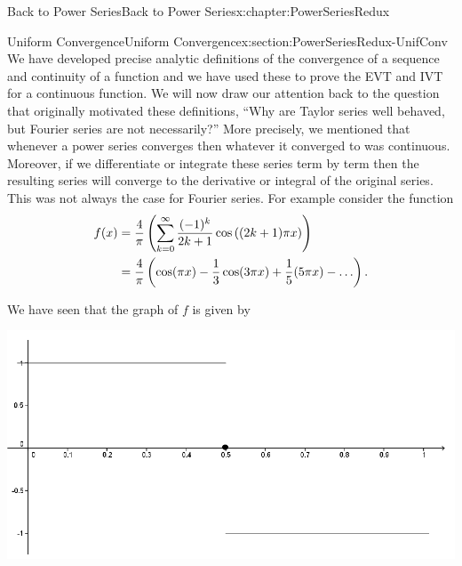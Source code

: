 
\typeout{************************************************}
\typeout{************************************************}
%
\begin{chapterptx}{Back to Power Series}{}{Back to Power Series}{}{}{x:chapter:PowerSeriesRedux}
	\typeout{************************************************}
	\typeout{************************************************}
	\begin{sectionptx}{Uniform Convergence}{}{Uniform Convergence}{}{}{x:section:PowerSeriesRedux-UnifConv}
		We have developed precise analytic definitions of the convergence of a sequence and continuity of a function and we have used these to prove the EVT and IVT for a continuous function. We will now draw our attention back to the question that originally motivated these definitions, ``Why are Taylor series well behaved, but Fourier series are not necessarily?'' More precisely, we mentioned that whenever a power series converges then whatever it converged to was continuous. Moreover, if we differentiate or integrate these series term by term then the resulting series will converge to the derivative or integral of the original series. This was not always the case for Fourier series. For example consider the function%
		\begin{align*}
			f(x) & = \frac{4}{\pi}\left(\sum_{k=0}^\infty\frac{(-1)^k}{2k+1}\cos\left((2k+1)\pi x\right)\right)\\
			& = \frac{4}{\pi}\left(\cos(\pi x)-\frac13\cos(3\pi x)+\frac15 (5\pi x)-\ldots\right)\text{.}
		\end{align*}
		\par
		We have seen that the graph of \(f\) is given by%
		\begin{image}{0.075}{0.85}{0.075}%
			\includegraphics[width=\linewidth]{external/images/Ch7fig1.png}

\end{image}
\end{sectionptx}
\end{chapterptx}
